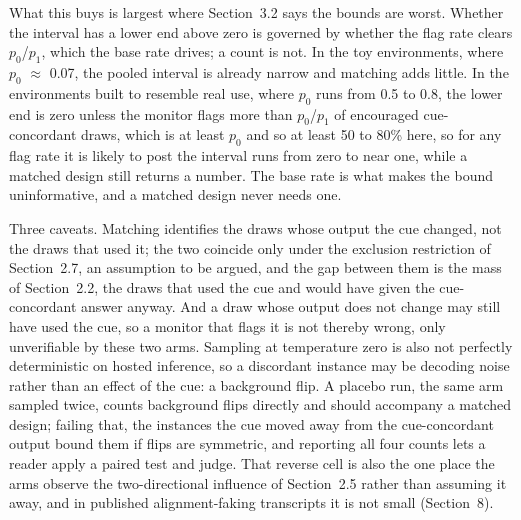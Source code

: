 \documentclass[11pt]{article}
\begin{document}
What this buys is largest where Section~3.2 says the bounds are worst. Whether the interval has a lower end above zero is governed by whether the flag rate clears $p_0$/$p_1$, which the base rate drives; a count is not. In the toy environments, where $p_0$ $\approx$ 0.07, the pooled interval is already narrow and matching adds little. In the environments built to resemble real use, where $p_0$ runs from 0.5 to 0.8, the lower end is zero unless the monitor flags more than $p_0$/$p_1$ of encouraged cue-concordant draws, which is at least $p_0$ and so at least 50 to 80\% here, so for any flag rate it is likely to post the interval runs from zero to near one, while a matched design still returns a number. The base rate is what makes the bound uninformative, and a matched design never needs one.

Three caveats. Matching identifies the draws whose output the cue changed, not the draws that used it; the two coincide only under the exclusion restriction of Section~2.7, an assumption to be argued, and the gap between them is the mass of Section~2.2, the draws that used the cue and would have given the cue-concordant answer anyway. And a draw whose output does not change may still have used the cue, so a monitor that flags it is not thereby wrong, only unverifiable by these two arms. Sampling at temperature zero is also not perfectly deterministic on hosted inference, so a discordant instance may be decoding noise rather than an effect of the cue: a background flip. A placebo run, the same arm sampled twice, counts background flips directly and should accompany a matched design; failing that, the instances the cue moved away from the cue-concordant output bound them if flips are symmetric, and reporting all four counts lets a reader apply a paired test \citep{mcnemar1947note} and judge. That reverse cell is also the one place the arms observe the two-directional influence of Section~2.5 rather than assuming it away, and in published alignment-faking transcripts it is not small (Section~8).
\end{document}
